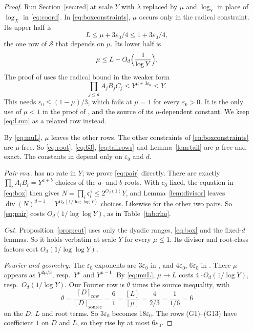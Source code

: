 \documentclass{amsart}
\numberwithin{equation}{section}
\numberwithin{table}{section}
\begin{document}
\begin{proof}
Run Section~\ref{sec:red} at scale $Y$ with $\lambda$ replaced by $\mu$ and
$\log_Y$ in place of $\log_X$ in \eqref{eq:coord}. In
\eqref{eq:boxconstraints}, $\mu$ occurs only in the radical constraint. Its
upper half is
\begin{equation}\label{eq:Lmu}
 L\le\mu+3\varepsilon_0/4\le1+3\varepsilon_0/4,
\end{equation}
the one row of $\mathcal S$ that depends on $\mu$. Its lower half is
\begin{equation}\label{eq:muL}
 \mu\le L+O_d\Bigl(\frac1{\log Y}\Bigr).
\end{equation}
The proof of \cite[Theorem~1.3]{BBLT} uses the radical bound in the weaker form
\[
 \prod_{j\le d}A_jB_jC_j\le Y^{\mu+3\varepsilon_0}\le Y.
\]
This needs $\varepsilon_0\le(1-\mu)/3$, which fails at $\mu=1$ for every
$\varepsilon_0>0$. It is the only use of $\mu<1$ in the proof of
\cite[Theorem~1.3]{BBLT}, and the source of its $\mu$-dependent constant. We
keep \eqref{eq:Lmu} as a relaxed row instead.

By \eqref{eq:muL}, $\mu$ leaves the other rows. The other constraints of
\eqref{eq:boxconstraints} are $\mu$-free. So \eqref{eq:root}, \eqref{eq:63},
\eqref{eq:tailrows} and Lemma~\ref{lem:tail} are $\mu$-free and exact. The
constants in \cite[Propositions~2.1, 3.1, 4.1]{BBLT} depend only on
$\varepsilon_0$ and $d$.

\emph{Pair row.} \cite[Proposition~2.3]{BBLT} has no rate in $Y$; we prove
\eqref{eq:pair} directly. There are exactly $\prod_iA_iB_i=Y^{a+b}$
choices of the $a$- and $b$-roots. With $c_0$ fixed, the equation in
\eqref{eq:box} then gives $N=\prod_i\mathfrak c_i^{\,i}\le2^{O_d(1)}Y$, and
Lemma~\ref{lem:divisor} leaves $\operatorname{div}(N)^{d-1}=Y^{O_d(1/\log\log Y)}$
choices. Likewise for the other two pairs. So \eqref{eq:pair} costs
$O_d(1/\log\log Y)$, as in Table~\ref{tab:rho}.

\emph{Cut.} Proposition~\ref{prop:cut} uses only the dyadic ranges,
\eqref{eq:box} and the fixed-$d$ lemmas. So it holds verbatim at scale $Y$ for
every $\mu\le1$. Its divisor and root-class factors cost
$O_d(1/\log\log Y)$.

\emph{Fourier and geometry.} The $\varepsilon_0$-exponents are $3\varepsilon_0$
in \cite[Proposition~3.1]{BBLT}, and $4\varepsilon_0$, $6\varepsilon_0$ in
\cite[Proposition~4.1]{BBLT}. There $\mu$ appears as $Y^{2\mu/3}$, resp.\
$Y^{\mu}$ and $Y^{\mu-1}$. By \eqref{eq:muL}, $\mu\to L$ costs
$4\cdot O_d(1/\log Y)$, resp.\ $O_d(1/\log Y)$. Our Fourier row is $\theta$
times the source inequality, with
\[
 \theta=\frac{[D]_{\text{row}}}{[D]_{\text{source}}}=\frac61
 =\frac{[L]}{[\mu]}=\frac{4}{2/3}=\frac1{1/6}=6
\]
on the $D$, $L$ and root terms. So $3\varepsilon_0$ becomes $18\varepsilon_0$.
The rows (G1)--(G13) have coefficient $1$ on $D$ and $L$, so they rise by at
most $6\varepsilon_0$.


\end{proof}
\end{document}
